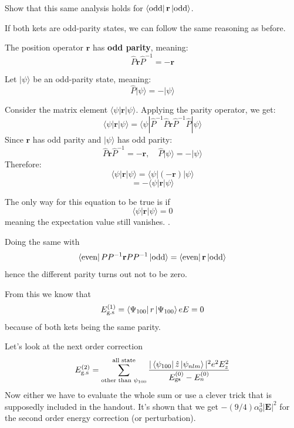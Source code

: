 \documentclass[10pt]{article}
\renewcommand{\vec}{\mathbf}
\begin{document}
\begin{prob}
	Show that this same analysis holds for $\bra{\text{odd}} \vec{r} \ket{\text{odd}}$.
\end{prob}
\begin{solu}
	\begin{small}
		If both kets are odd-parity states, we can follow the same reasoning as before.

   The position operator \( \mathbf{r} \) has \textbf{odd parity}, meaning:  
   \[
   \hat{P} \mathbf{r} \hat{P}^{-1} = -\mathbf{r}
   \]

   Let \( | \psi \rangle \) be an odd-parity state, meaning:  
   \[
   \hat{P} | \psi \rangle = -| \psi \rangle
   \]

   Consider the matrix element \( \langle \psi | \mathbf{r} | \psi \rangle \). Applying the parity operator, we get:  
   \[
   \langle \psi | \mathbf{r} | \psi \rangle = \langle \psi | \hat{P}^{-1} \hat{P} \mathbf{r} \hat{P}^{-1} \hat{P} | \psi \rangle
   \]
   Since \( \mathbf{r} \) has odd parity and \( | \psi \rangle \) has odd parity:  
   \[
   \hat{P} \mathbf{r} \hat{P}^{-1} = -\mathbf{r}, \quad \hat{P} | \psi \rangle = -| \psi \rangle
   \]
   Therefore:  
   \[
   \langle \psi | \mathbf{r} | \psi \rangle = \langle \psi | (-\mathbf{r}) | \psi \rangle
   \]
   \[
   = -\langle \psi | \mathbf{r} | \psi \rangle
   \]

   The only way for this equation to be true is if  
   \[
   \langle \psi | \mathbf{r} | \psi \rangle = 0
   \]
   meaning the expectation value still vanishes. \qedsymbol.
	\end{small}
\end{solu}

Doing the same with \[
\bra{\text{even}} P P^{-1} \vec{r} P  P^{-1} \ket{\text{odd}} = \bra{\text{even}} \vec{r} \ket{\text{odd}} 
\] hence the different parity turns out not to be zero. 

From this we know that 
\[
	E^{(1)}_{\text{g.s}} = 
	\bra{\Psi_{100} } r \ket{\Psi_{100}} e E =0 
\] 
because of both kets being the same parity. 

Let's look at the next order correction 
\[
	E_\text{g.s}^{(2)} = \sum_{\text{other than } \psi_{100}}^{\text{all state}} 
	\frac{
		| \bra{\psi_{100}} \hat{z} \ket{\psi_{nlm}} | ^2 e ^2 E_z^2 
	}{E_{\text{gs}}^{(0)} - E_{n}^{(0)}}
\] 
Now either we have to evaluate the whole sum or use a clever trick that is supposedly included in the handout. It's shown that we get $- ( 9 / 4) \alpha_0^3 |\vec{E}|^2$ for the second order energy correction (or perturbation).  
\end{document}
